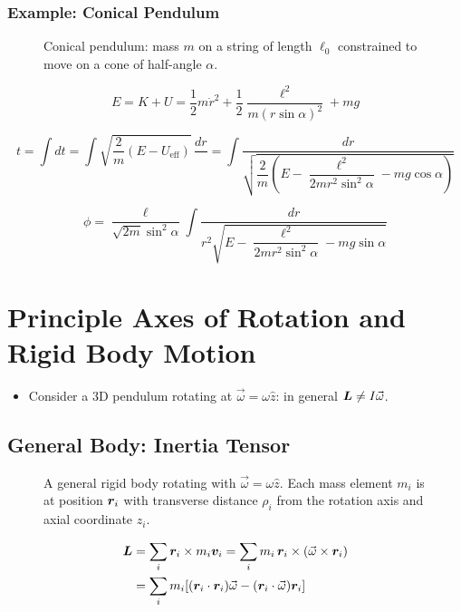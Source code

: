 \subsection*{Example: Conical Pendulum}

\begin{figure}[H]
    \centering
    \caption{Conical pendulum: mass $m$ on a string of length $\ell_0$ constrained to move on a cone of half-angle $\alpha$.}
\end{figure}

\[
    E = K + U = \frac{1}{2}m\dot{r}^2 + \frac{1}{2}\frac{\ell^2}{m(r\sin\alpha)^2} + mg
\]

\[
    t = \int dt = \int\sqrt{\frac{2}{m}(E-U_{\text{eff}})}\,\frac{dr}{\phantom{x}}
    = \int\frac{dr}{\sqrt{\dfrac{2}{m}\!\left(E - \dfrac{\ell^2}{2mr^2\sin^2\!\alpha} - mg\cos\alpha\right)}}
\]

\[
    \phi = \frac{\ell}{\sqrt{2m}\sin^2\!\alpha}\int\frac{dr}{r^2\sqrt{E - \dfrac{\ell^2}{2mr^2\sin^2\!\alpha} - mg\sin\alpha}}
\]

\chapter{Principle Axes of Rotation and Rigid Body Motion}


\begin{itemize}
    \item Consider a 3D pendulum rotating at $\vec{\omega} = \omega\hat{z}$: in general $\vect{L} \neq I\vec{\omega}$.
\end{itemize}

\section{General Body: Inertia Tensor}

\begin{figure}[H]
    \centering
    \caption{A general rigid body rotating with $\vec{\omega} = \omega\hat{z}$. Each mass element $m_i$ is at position $\bm{r}_i$ with transverse distance $\rho_i$ from the rotation axis and axial coordinate $z_i$.}
\end{figure}

\begin{align*}
    \vect{L} &= \sum_i \lvect{r}_i \times m_i\lvect{v}_i
    = \sum_i m_i\,\lvect{r}_i \times (\vec{\omega}\times\lvect{r}_i) \\
    &= \sum_i m_i\!\left[(\lvect{r}_i\cdot\lvect{r}_i)\vec{\omega} - (\lvect{r}_i\cdot\vec{\omega})\lvect{r}_i\right]
\end{align*}

